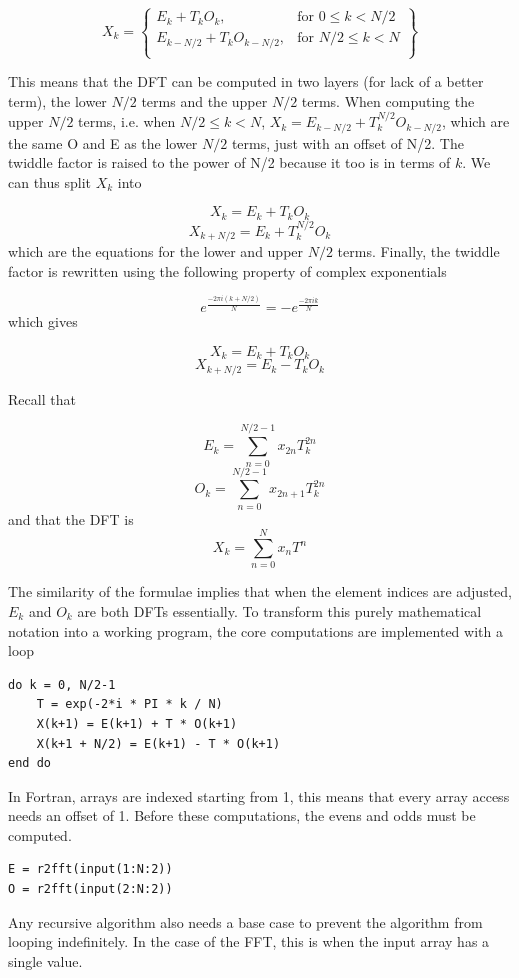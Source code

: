 \[
X_k = \left\{\begin{array}{lr}
    E_k + T_kO_k, & \text{for } 0 \leq k < N/2\\
    E_{k-N/2} + T_kO_{k-N/2}, & \text{for } N/2\leq k< N\\
    \end{array}\right\}
\]

This means that the DFT can be computed in two layers (for lack of a better term), the lower $N/2$ terms and the upper $N/2$ terms.
When computing the upper $N/2$ terms, i.e. when $N/2 \leq k < N$, $X_k = E_{k-N/2} + T_k^{N/2}O_{k-N/2}$, which are the same O and E as the lower $N/2$ terms, just with an offset of N/2. The twiddle factor is raised to the power of N/2 because it too is in terms of $k$. We can thus split $X_k$ into 

$$X_k = E_k + T_kO_k$$  
$$X_{k+N/2} = E_k + T_k^{N/2}O_k$$
which are the equations for the lower and upper $N/2$ terms. Finally, the twiddle factor is rewritten using the following property of complex exponentials

$$e^{\frac{-2\pi i(k+N/2)}{N}} = -e^{\frac{-2\pi ik}{N}}$$
which gives

$$X_k = E_k + T_kO_k$$  
$$X_{k+N/2} = E_k - T_kO_k$$

Recall that

$$E_k = \sum^{N/2-1}_{n=0} x_{2n}T_k^{2n}$$
$$O_k = \sum^{N/2-1}_{n=0} x_{2n+1}T_k^{2n}$$
and that the DFT is
$$X_k = \sum^{N}_{n=0} x_nT^{n}$$

The similarity of the formulae implies that when the element indices are adjusted, $E_k$ and $O_k$ are both DFTs essentially. To transform this purely mathematical notation into a working program, the core computations are implemented with a loop

\begin{lstlisting}
do k = 0, N/2-1
    T = exp(-2*i * PI * k / N) 
    X(k+1) = E(k+1) + T * O(k+1)
    X(k+1 + N/2) = E(k+1) - T * O(k+1)
end do
\end{lstlisting}

In Fortran, arrays are indexed starting from 1, this means that every array access needs an offset of 1. Before these computations, the evens and odds must be computed.

\begin{lstlisting}
E = r2fft(input(1:N:2))
O = r2fft(input(2:N:2))
\end{lstlisting}

Any recursive algorithm also needs a base case to prevent the algorithm from looping indefinitely. In the case of the FFT, this is when the input array has a single value.

